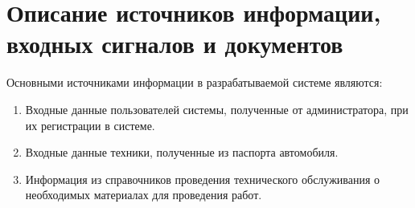 \documentclass[../nirs.tex]{subfiles}
\begin{document}
\section{Описание источников информации, входных сигналов и документов}
Основными источниками информации в разрабатываемой системе являются:
\begin{enumerate}

	\item Входные данные пользователей системы, полученные от администратора,
		при их регистрации в системе.

	\item Входные данные техники, полученные из паспорта автомобиля.

	\item Информация из справочников проведения технического обслуживания о
		необходимых материалах для проведения работ.

\end{enumerate} 
\end{document}
